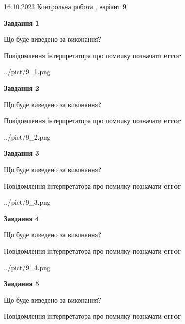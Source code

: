 \documentclass[12pt, ukrainian]{article}
\begin{document}
{\Large{16.10.2023 Контрольна робота , варіант  \No \textbf { 9 }\par}}
{
\begin {large}
{\begin {center}\textbf{Завдання 1}\end {center}}\par
Що буде виведено за виконання? \par
Повідомлення інтерпретатора про помилку позначати \textbf{error}

\begin{center}
	{../pict/9_1.png}
\end{center}
\newpage

{\begin {center}\textbf{Завдання 2}\end {center}}\par
Що буде виведено за виконання? \par
Повідомлення інтерпретатора про помилку позначати \textbf{error}

\begin{center}
	{../pict/9_2.png}
\end{center}
\newpage

{\begin {center}\textbf{Завдання 3}\end {center}}\par
Що буде виведено за виконання? \par
Повідомлення інтерпретатора про помилку позначати \textbf{error}

\begin{center}
	{../pict/9_3.png}
\end{center}
\newpage

{\begin {center}\textbf{Завдання 4}\end {center}}\par
Що буде виведено за виконання? \par
Повідомлення інтерпретатора про помилку позначати \textbf{error}

\begin{center}
	{../pict/9_4.png}
\end{center}
\newpage

{\begin {center}\textbf{Завдання 5}\end {center}}\par
Що буде виведено за виконання? \par
Повідомлення інтерпретатора про помилку позначати \textbf{error}


\end{large}}
\end{document}
